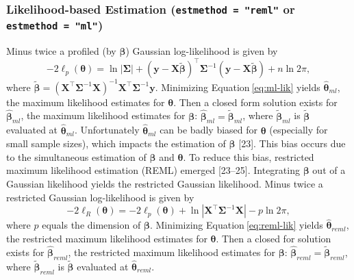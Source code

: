 \documentclass[10pt,letterpaper]{article}
\begin{document}
\hypertarget{likelihood-based-estimation-estmethod-reml-or-estmethod-ml}{%
\subsubsection{\texorpdfstring{Likelihood-based Estimation
(\texttt{estmethod\ =\ "reml"} or
\texttt{estmethod\ =\ "ml"})}{Likelihood-based Estimation (estmethod = "reml" or estmethod = "ml")}}\label{likelihood-based-estimation-estmethod-reml-or-estmethod-ml}}

Minus twice a profiled (by \(\boldsymbol{\beta}\)) Gaussian
log-likelihood is given by \begin{equation}\label{eq:ml-lik}
  -2\ell_p(\boldsymbol{\theta}) = \ln{|\boldsymbol{\Sigma}|} + (\mathbf{y} - \mathbf{X} \tilde{\boldsymbol{\beta}})^\top \boldsymbol{\Sigma}^{-1} (\mathbf{y} - \mathbf{X} \tilde{\boldsymbol{\beta}}) + n \ln{2\pi},
\end{equation} where
\(\tilde{\boldsymbol{\beta}} = (\mathbf{X}^\top \mathbf{\Sigma}^{-1} \mathbf{X})^{-1} \mathbf{X}^\top \mathbf{\Sigma}^{-1} \mathbf{y}\).
Minimizing Equation\(~\)\ref{eq:ml-lik} yields
\(\boldsymbol{\hat{\theta}}_{ml}\), the maximum likelihood estimates for
\(\boldsymbol{\theta}\). Then a closed form solution exists for
\(\boldsymbol{\hat{\beta}}_{ml}\), the maximum likelihood estimates for
\(\boldsymbol{\beta}\):
\(\boldsymbol{\hat{\beta}}_{ml} = \tilde{\boldsymbol{\beta}}_{ml}\),
where \(\tilde{\boldsymbol{\beta}}_{ml}\) is
\(\tilde{\boldsymbol{\beta}}\) evaluated at
\(\boldsymbol{\hat{\theta}}_{ml}\). Unfortunately
\(\boldsymbol{\hat{\theta}}_{ml}\) can be badly biased for
\(\boldsymbol{\theta}\) (especially for small sample sizes), which
impacts the estimation of \(\boldsymbol{\beta}\) {[}23{]}. This bias
occurs due to the simultaneous estimation of \(\boldsymbol{\beta}\) and
\(\boldsymbol{\theta}\). To reduce this bias, restricted maximum
likelihood estimation (REML) emerged {[}23--25{]}. Integrating
\(\boldsymbol{\beta}\) out of a Gaussian likelihood yields the
restricted Gaussian likelihood. Minus twice a restricted Gaussian
log-likelihood is given by \begin{equation}\label{eq:reml-lik}
  -2\ell_R(\boldsymbol{\theta}) = -2\ell_p(\boldsymbol{\theta})  + \ln{|\mathbf{X}^\top \boldsymbol{\Sigma}^{-1} \mathbf{X}|} - p \ln{2\pi} ,
\end{equation} where \(p\) equals the dimension of
\(\boldsymbol{\beta}\). Minimizing Equation\(~\)\ref{eq:reml-lik} yields
\(\boldsymbol{\hat{\theta}}_{reml}\), the restricted maximum likelihood
estimates for \(\boldsymbol{\theta}\). Then a closed for solution exists
for \(\boldsymbol{\hat{\beta}}_{reml}\), the restricted maximum
likelihood estimates for \(\boldsymbol{\beta}\):
\(\boldsymbol{\hat{\beta}}_{reml} = \tilde{\boldsymbol{\beta}}_{reml}\),
where \(\tilde{\boldsymbol{\beta}}_{reml}\) is
\(\tilde{\boldsymbol{\beta}}\) evaluated at
\(\boldsymbol{\hat{\theta}}_{reml}\).
\end{document}
